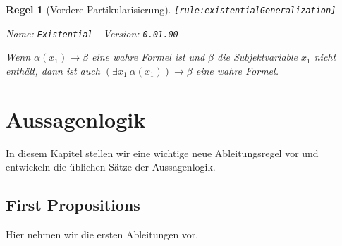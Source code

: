 \documentclass[a4paper,german,10pt,twoside]{book}
\newtheorem{rul}{Regel}
\theoremstyle{definition}
\theoremstyle{remark}
\begin{document}
\begin{rul}[Vordere Partikularisierung]
\label{rule:existentialGeneralization} \hypertarget{rule:existentialGeneralization}{}
{\tt \tiny [\verb]rule:existentialGeneralization]]}

\par
{\em   Name: \verb]Existential]  -  Version: \verb]0.01.00]}


Wenn $\alpha(x_1) \rightarrow \beta$ eine wahre Formel ist und $\beta$ die Subjektvariable $x_1$ nicht enth{\"a}lt, dann ist auch $(\exists x_1~\alpha(x_1)) \rightarrow \beta$ eine wahre Formel.
\end{rul}




\chapter{Aussagenlogik} \label{chapter4} \hypertarget{chapter4}{}

In diesem Kapitel stellen wir eine wichtige neue Ableitungsregel vor und entwickeln die {\"u}blichen S{\"a}tze der Aussagenlogik.

\section{First Propositions} \label{chapter4_section1} \hypertarget{chapter4_section1}{}
Hier nehmen wir die ersten Ableitungen vor.
\end{document}
